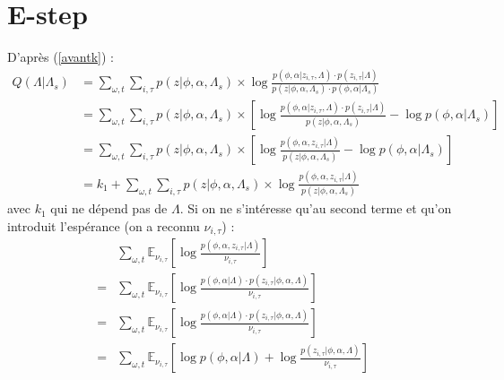 \documentclass[a4paper,12pt]{article}
\begin{document}
\section{E-step}
D'après (\ref{avantk}) :
\begin{align}
Q(\Lambda|\Lambda_s) & = \displaystyle\sum_{\omega,t} \displaystyle\sum_{i, \tau} p(z|\phi,\alpha,\Lambda_s) \times \log \frac{p(\phi, \alpha | z_{i, \tau}, \Lambda) \cdot p(z_{i, \tau} | \Lambda)}{p(z|\phi,\alpha,\Lambda_s) \cdot p(\phi, \alpha | \Lambda_s)} \nonumber \\
& = \displaystyle\sum_{\omega,t} \displaystyle\sum_{i, \tau} p(z|\phi,\alpha,\Lambda_s) \times [ \log \frac{p(\phi, \alpha | z_{i, \tau}, \Lambda) \cdot p(z_{i, \tau} | \Lambda)}{p(z|\phi,\alpha,\Lambda_s)}  - \log p(\phi, \alpha | \Lambda_s) ] \nonumber \\
& = \displaystyle\sum_{\omega,t} \displaystyle\sum_{i, \tau} p(z|\phi,\alpha,\Lambda_s) \times [ \log \frac{p(\phi, \alpha, z_{i, \tau} | \Lambda)}{p(z|\phi,\alpha,\Lambda_s)}  - \log p(\phi, \alpha | \Lambda_s) ] \nonumber \\
& = k_1 + \displaystyle\sum_{\omega,t} \displaystyle\sum_{i, \tau} p(z|\phi,\alpha,\Lambda_s) \times \log \frac{p(\phi, \alpha, z_{i, \tau} | \Lambda)}{p(z|\phi,\alpha,\Lambda_s)} \nonumber
\end{align}
avec $k_1$ qui ne dépend pas de $\Lambda$. Si on ne s'intéresse qu'au second terme et qu'on introduit l'espérance (on a reconnu $\nu_{i,\tau}$) :
\begin{align*}
& \displaystyle\sum_{\omega,t} \mathbb{E}_{\nu_{i,\tau}} [ \log \frac{p(\phi, \alpha, z_{i, \tau} | \Lambda)}{\nu_{i,\tau}}] \\
= & \displaystyle\sum_{\omega,t} \mathbb{E}_{\nu_{i,\tau}} [ \log \frac{p(\phi, \alpha | \Lambda) \cdot p(z_{i, \tau} |\phi, \alpha, \Lambda)}{\nu_{i,\tau}}] \\
= & \displaystyle\sum_{\omega,t} \mathbb{E}_{\nu_{i,\tau}} [ \log \frac{p(\phi, \alpha | \Lambda) \cdot p(z_{i, \tau} |\phi, \alpha, \Lambda)}{\nu_{i,\tau}}] \\
= & \displaystyle\sum_{\omega,t} \mathbb{E}_{\nu_{i,\tau}} [\log p(\phi, \alpha | \Lambda) + \log \frac{p(z_{i, \tau} |\phi, \alpha, \Lambda)}{\nu_{i,\tau}}]
\end{align*}
\end{document}
